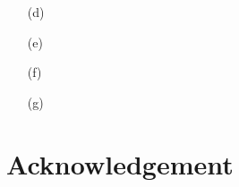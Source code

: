 \documentclass[10pt, a4paper]{article}
\begin{document}
{\begin{enumerate}
  \item[(d)]
  \item[(e)]
  \item[(f)]
  \item[(g)]     
\end{enumerate}


\section{Acknowledgement}

}

\makereferences


\end{document}
